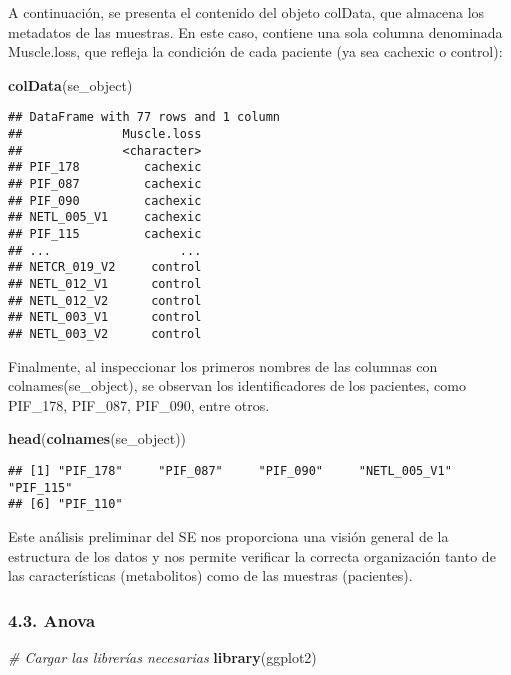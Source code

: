 \documentclass[
]{article}
\newenvironment{Shaded}{\begin{snugshade}}{\end{snugshade}}
\newcommand{\CommentTok}[1]{\textcolor[rgb]{0.56,0.35,0.01}{\textit{#1}}}
\newcommand{\FunctionTok}[1]{\textcolor[rgb]{0.13,0.29,0.53}{\textbf{#1}}}
\newcommand{\NormalTok}[1]{#1}
\begin{document}
A continuación, se presenta el contenido del objeto colData, que
almacena los metadatos de las muestras. En este caso, contiene una sola
columna denominada Muscle.loss, que refleja la condición de cada
paciente (ya sea cachexic o control):

\begin{Shaded}
\begin{Highlighting}[]
\FunctionTok{colData}\NormalTok{(se\_object)}
\end{Highlighting}
\end{Shaded}

\begin{verbatim}
## DataFrame with 77 rows and 1 column
##              Muscle.loss
##              <character>
## PIF_178         cachexic
## PIF_087         cachexic
## PIF_090         cachexic
## NETL_005_V1     cachexic
## PIF_115         cachexic
## ...                  ...
## NETCR_019_V2     control
## NETL_012_V1      control
## NETL_012_V2      control
## NETL_003_V1      control
## NETL_003_V2      control
\end{verbatim}

Finalmente, al inspeccionar los primeros nombres de las columnas con
colnames(se\_object), se observan los identificadores de los pacientes,
como PIF\_178, PIF\_087, PIF\_090, entre otros.

\begin{Shaded}
\begin{Highlighting}[]
\FunctionTok{head}\NormalTok{(}\FunctionTok{colnames}\NormalTok{(se\_object))}
\end{Highlighting}
\end{Shaded}

\begin{verbatim}
## [1] "PIF_178"     "PIF_087"     "PIF_090"     "NETL_005_V1" "PIF_115"    
## [6] "PIF_110"
\end{verbatim}

Este análisis preliminar del SE nos proporciona una visión general de la
estructura de los datos y nos permite verificar la correcta organización
tanto de las características (metabolitos) como de las muestras
(pacientes).

\subsubsection{4.3. Anova}\label{anova}

\begin{Shaded}
\begin{Highlighting}[]
\CommentTok{\# Cargar las librerías necesarias}
\FunctionTok{library}\NormalTok{(ggplot2)}
\end{Highlighting}
\end{Shaded}
\end{document}
